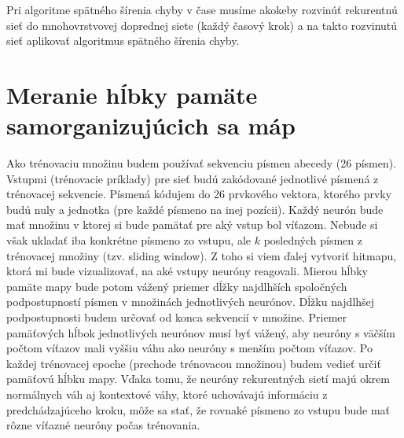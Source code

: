 Pri algoritme spätného šírenia chyby v čase musíme akokeby rozvinúť rekurentnú sieť do mnohovrstvovej doprednej siete (každý časový krok) a na takto rozvinutú sieť aplikovať algoritmus spätného šírenia chyby.
\section{Meranie hĺbky pamäte samorganizujúcich sa máp}
Ako trénovaciu množinu budem používať sekvenciu písmen abecedy (26 písmen).
Vstupmi (trénovacie príklady) pre sieť budú zakódované jednotlivé písmená z trénovacej sekvencie.
Písmená kódujem do 26 prvkového vektora, ktorého prvky budú nuly a jednotka (pre každé písmeno na inej pozícii).
Každý neurón bude mať množinu v ktorej si bude pamätať pre aký vstup bol víťazom. Nebude si však ukladať iba konkrétne písmeno zo vstupu, ale $k$ posledných písmen z trénovacej množiny (tzv. sliding window). 
Z toho si viem ďalej vytvoriť hitmapu, ktorá mi bude vizualizovať, na aké vstupy neuróny reagovali.
Mierou hĺbky pamäte mapy bude potom vážený priemer dĺžky najdlhších spoločných podpostupností písmen v množinách jednotlivých neurónov. Dĺžku najdlhšej podpostupnosti budem určovať od konca sekvencií v množine. Priemer pamäťových hĺbok jednotlivých neurónov musí byť vážený, aby neuróny s väčším počtom víťazov mali vyššiu váhu ako neuróny s menším počtom víťazov.
Po každej trénovacej epoche (prechode trénovacou množinou) budem vedieť určiť pamäťovú hĺbku mapy.
Vďaka tomu, že neuróny rekurentných sietí majú okrem normálnych váh aj kontextové váhy, ktoré uchovávajú informáciu z predchádzajúceho kroku,  môže sa stať, že rovnaké písmeno zo vstupu bude mať rôzne víťazné neuróny počas trénovania.










